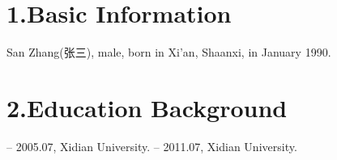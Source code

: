 
\begin{resume}

\section*{1.\hspace{0.75em}Basic Information}
San Zhang(张三), male, born in Xi'an, Shaanxi, in January 1990.
\section*{2.\hspace{0.75em}Education Background}
\begin{resumelist*}
 -- 2005.07, Xidian University.
 -- 2011.07, Xidian University.
\end{resumelist*}

\end{resume}
